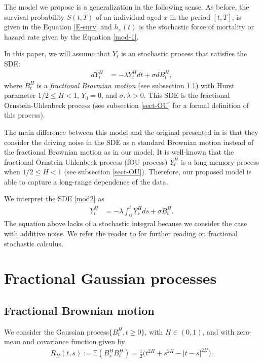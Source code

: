 \documentclass[smallextended]{svjour3}
\newcommand{\E}{\mathbb{E}}
\begin{document}
The model we propose is a generalization in the following sense.
As before, the survival probability $S(t,T)$ of an individual aged
$x$ in the period $[t,T]$, is given in the Equation \eqref{E-surv}
and $h_x(t)$ is the stochastic force of mortality or hazard rate given by the
Equation \eqref{mod-1}.

In this paper, we will assume that $Y_t$ is an stochastic process that satisfies the SDE:
\begin{align}
	dY_t^H&=-\lambda Y_t^Hdt+\sigma dB_t^H, \label{mod2}
\end{align}
where $B_t^H $ is a \emph{fractional Brownian motion} (see subsection \ref{fBm})
     with Hurst parameter $1/2 \le H< 1$,  $Y_0=0$, and
$\sigma,\lambda> 0$.
This SDE is the fractional Ornstein-Uhlenbeck process (see subsection \ref{sect-OU} for a formal definition of this process). 



The main difference between this model and the original presented
in \cite{mi-pr} is that they consider the driving noise in the SDE as a standard
Brownian motion instead of the fractional Brownian motion as in our model. It is well-known that the fractional Ornstein-Uhlenbeck process (fOU process) $ Y_t^H$ is a long memory process when $1/2 \le H< 1$ (see subsection \ref{sect-OU}). Therefore, our proposed model is able to capture a long-range dependence of the data.



We interpret the SDE \eqref{mod2} as
\begin{align}
	Y_t^H&=-\lambda\int_0^t Y_s^Hds+\sigma B_t^H.\label{mod3}
\end{align}
The equation above lacks of a stochastic integral because we
consider the case with additive noise.  We refer the reader to \cite{mi} for further reading on fractional stochastic calculus.


\section{Fractional Gaussian processes} \label{fgn}

\subsection{Fractional Brownian motion} \label{fBm}

        We consider the Gaussian process$\{B_t^H,t\ge 0\}$, with $H\in (0,1)$,
    and with zero-mean and covariance function given by
    \begin{align}
        R_H(t,s):=
            \E(
                B_s^H B_t^H
            )
            =
            \tfrac{1}{2}
            \big(
                t ^ {2 H} + s ^ {2 H}
                - |t - s| ^ {2 H}
            \big).\label{s1.1}
    \end{align}
\end{document}
